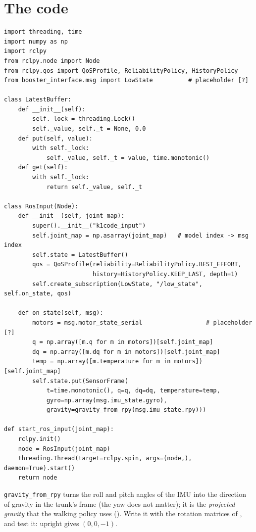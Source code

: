 \section*{The code}
\begin{verbatim}
import threading, time
import numpy as np
import rclpy
from rclpy.node import Node
from rclpy.qos import QoSProfile, ReliabilityPolicy, HistoryPolicy
from booster_interface.msg import LowState          # placeholder [?]

class LatestBuffer:
    def __init__(self):
        self._lock = threading.Lock()
        self._value, self._t = None, 0.0
    def put(self, value):
        with self._lock:
            self._value, self._t = value, time.monotonic()
    def get(self):
        with self._lock:
            return self._value, self._t

class RosInput(Node):
    def __init__(self, joint_map):
        super().__init__("k1code_input")
        self.joint_map = np.asarray(joint_map)   # model index -> msg index
        self.state = LatestBuffer()
        qos = QoSProfile(reliability=ReliabilityPolicy.BEST_EFFORT,
                         history=HistoryPolicy.KEEP_LAST, depth=1)
        self.create_subscription(LowState, "/low_state", self.on_state, qos)

    def on_state(self, msg):
        motors = msg.motor_state_serial                  # placeholder [?]
        q = np.array([m.q for m in motors])[self.joint_map]
        dq = np.array([m.dq for m in motors])[self.joint_map]
        temp = np.array([m.temperature for m in motors])[self.joint_map]
        self.state.put(SensorFrame(
            t=time.monotonic(), q=q, dq=dq, temperature=temp,
            gyro=np.array(msg.imu_state.gyro),
            gravity=gravity_from_rpy(msg.imu_state.rpy)))

def start_ros_input(joint_map):
    rclpy.init()
    node = RosInput(joint_map)
    threading.Thread(target=rclpy.spin, args=(node,), daemon=True).start()
    return node
\end{verbatim}
\verb!gravity_from_rpy! turns the roll and pitch angles of the IMU into the direction of gravity in the trunk's frame (the yaw does not matter); it is the \emph{projected gravity} that the walking policy uses (). Write it with the rotation matrices of , and test it: upright gives $(0,0,-1)$.

